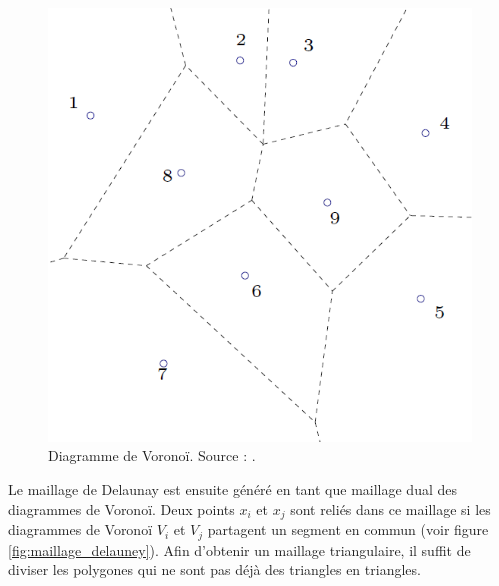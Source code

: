 \begin{figure}[!h]
    \centering
    \includegraphics[scale=0.6]{images/voronoi_diagram.png}
    \caption{Diagramme de Voronoï. Source : \cite{hecht2007maillage}.}
    \label{fig:voronoi_diagram}
\end{figure}

Le maillage de Delaunay est ensuite généré en tant que maillage dual des diagrammes de Voronoï. Deux points $x_i$ et $x_j$ sont reliés dans ce maillage si les diagrammes de Voronoï $V_i$ et $V_j$ partagent un segment en commun (voir figure \ref{fig:maillage_delauney}). Afin d'obtenir un maillage triangulaire, il suffit de diviser les polygones qui ne sont pas déjà des triangles en triangles.

